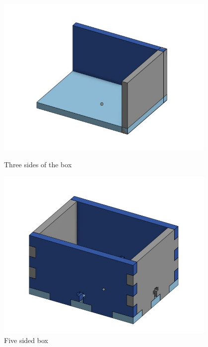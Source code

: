 \begin{figure}[ht]
\centering
\begin{minipage}[b]{.48\textwidth}
  \centering
  \includegraphics[width=0.95\textwidth]{Meetings/August/08-31-21/8-31-21_CAD_Image1 - Nathan Forrer.JPG}
  \caption{Three sides of the box}
  \label{fig:083121_1}
\end{minipage}%
\hfill%
\begin{minipage}[b]{.48\textwidth}
  \centering
  \includegraphics[width=0.95\textwidth]{Meetings/August/08-31-21/8-31-21_CAD_Image2 - Nathan Forrer.JPG}
  \caption{Five sided box}
  \label{fig:083121_2}
\end{minipage}
\end{figure}


